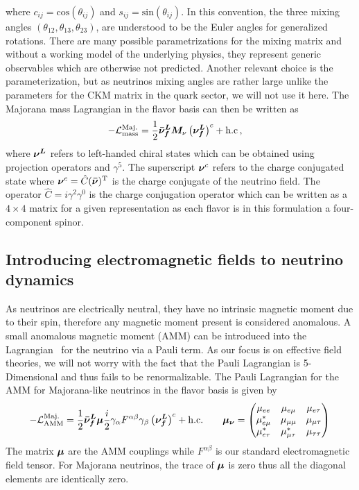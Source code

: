 where $c_{ij} = \mathrm{cos}(\theta_{ij})$ and $s_{ij} = \mathrm{sin}(\theta_{ij})$. In this convention, the three mixing angles $(\theta_{12}, \theta_{13}, \theta_{23})$, are understood to be the Euler angles for generalized rotations. There are many possible parametrizations for the mixing matrix and without a working model of the underlying physics, they represent generic observables which are otherwise not predicted. Another relevant choice is the~\cite{wolfenstein1983parametrization} parameterization, but as neutrinos mixing angles are rather large unlike the parameters for the CKM matrix in the quark sector, we will not use it here. The Majorana mass Lagrangian in the flavor basis can then be written as
\begin{alignat}{1}
	\label{mass:1} -\mathcal{L}_{\mathrm{mass}}^{\mathrm{Maj.}}&=\frac{1}{2}\boldsymbol{\bar{\nu}_{f}^{L}}\boldsymbol{M}_{\nu}\left(\boldsymbol{\nu_{f}^{L}}\right)^{c}+\mathrm{h.c}\,,
\end{alignat}
where $\boldsymbol{\nu^{L}}$ refers to left-handed chiral states which can be obtained using projection operators and $\gamma^{5}$. The superscript $\boldsymbol{\nu}^{c}$ refers to the charge conjugated state where $\boldsymbol{\nu}^{c} = \hat{C}(\boldsymbol{\bar{\nu}})^{\rm T}$ is the charge conjugate of the neutrino field. The operator $\hat{C} = i\gamma^{2}\gamma^{0}$ is the charge conjugation operator which can be written as a $4\times4$ matrix for a given representation as each flavor is in this formulation a four-component spinor.


\subsection{Introducing electromagnetic fields to neutrino dynamics}
\label{sec:numoment}
\noindent As neutrinos are electrically neutral, they have no intrinsic magnetic moment due to their spin, therefore any magnetic moment present is considered anomalous. A small anomalous magnetic moment (AMM) can be introduced into the Lagrangian~\citep{Itzykson:1980rh,Steinmetz:2018ryf} for the neutrino via a Pauli term. As our focus is on effective field theories, we will not worry with the fact that the Pauli Lagrangian is 5-Dimensional and thus fails to be renormalizable. The Pauli Lagrangian for the AMM for Majorana-like neutrinos in the flavor basis is given by
\begin{align}
	\label{moment:1} -\mathcal{L}_{\rm{AMM}}^\mathrm{Maj.}=\frac{1}{2}\boldsymbol{\bar{\nu}_{f}^{L}}\boldsymbol{\mu}\frac{i}{2}\gamma_{\alpha}F^{\alpha\beta}\gamma_{\beta}\left(\boldsymbol{\nu_{f}^{L}}\right)^{c}+\rm{h.c.}\qquad
    \boldsymbol{\mu_{\nu}}=
	\begin{pmatrix}
		\mu_{ee} & \mu_{e\mu} & \mu_{e\tau} \\
		\mu_{e\mu}^{*} & \mu_{\mu\mu} & \mu_{\mu\tau} \\
		\mu_{e\tau}^{*} & \mu_{\mu\tau}^{*} & \mu_{\tau\tau}
	\end{pmatrix}
\end{align}
The matrix $\boldsymbol{\mu}$ are the AMM couplings while $F^{\alpha\beta}$ is our standard electromagnetic field tensor. For Majorana neutrinos, the trace of $\boldsymbol{\mu}$ is zero thus all the diagonal elements are identically zero.

